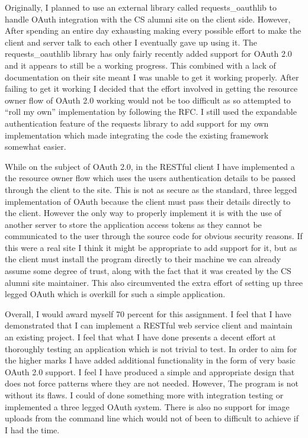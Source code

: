 \documentclass[paper=a4, fontsize=11pt]{scrartcl}	%
\numberwithin{equation}{section}															%
\numberwithin{figure}{section}																%
\numberwithin{table}{section}
\begin{document}
Originally, I planned to use an external library called requests\_oauthlib to handle OAuth integration with the CS alumni site on the client side. However, After spending an entire day exhausting making every possible effort to make the client and server talk to each other I eventually gave up using it. The requests\_oauthlib library has only fairly recently added support for OAuth 2.0 and it appears to still be a working progress. This combined with a lack of documentation on their site meant I was unable to get it working properly. After failing to get it working I decided that the effort involved in getting the resource owner flow of OAuth 2.0 working would not be too difficult as so attempted to ``roll my own'' implementation by following the RFC. I still used the expandable authentication feature of the requests library to add support for my own implementation which made integrating the code the existing framework somewhat easier.

While on the subject of OAuth 2.0, in the RESTful client I have implemented a the resource owner flow which uses the users authentication details to be passed through the client to the site. This is not as secure as the standard, three legged implementation of OAuth because the client must pass their details directly to the client. However the only way to properly implement it is with the use of another server to store the application access tokens as they cannot be communicated to the user through the source code for obvious security reasons. If this were a real site I think it might be appropriate to add support for it, but as the client must install the program directly to their machine we can already assume some degree of trust, along with the fact that it was created by the CS alumni site maintainer. This also circumvented the extra effort of setting up three legged OAuth which is overkill for such a simple application.

Overall, I would award myself 70 percent for this assignment. I feel that I have demonstrated that I can implement a RESTful web service client and maintain an existing project. I feel that what I have done presents a decent effort at thoroughly testing an application which is not trivial to test. In order to aim for the higher marks I have added additional functionality in the form of very basic OAuth 2.0 support. I feel I have produced a simple and appropriate design that does not force patterns where they are not needed. However, The program is not without its flaws. I could of done something more with integration testing or implemented a three legged OAuth system. There is also no support for image uploads from the command line which would not of been to difficult to achieve if I had the time.



\end{document}
